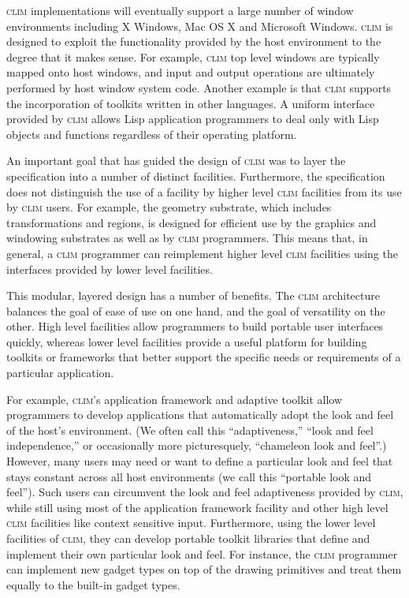 \documentclass[twocolumn,a4paper]{article}
\newcommand {\CLIM}{\textsc{clim}}
\begin{document}
\CLIM{} implementations will eventually support a large number of window environments
including X Windows, Mac OS X and Microsoft Windows. \CLIM{} is
designed to exploit the functionality provided by the host environment
to the degree that it makes sense. For example, \CLIM{} top level
windows are typically mapped onto host windows, and input and output
operations are ultimately performed by host window system
code. Another example is that \CLIM{} supports the incorporation of
toolkits written in other languages. A uniform interface provided by
\CLIM{} allows Lisp application programmers to deal only with Lisp
objects and functions regardless of their operating platform.

An important goal that has guided the design of \CLIM{} was to
layer the specification into a number of distinct
facilities. Furthermore, the specification does not distinguish the
use of a facility by higher level \CLIM{} facilities from its use by
\CLIM{} users. For example, the geometry substrate, which includes
transformations and regions, is designed for efficient use by the
graphics and windowing substrates as well as by \CLIM{} programmers. This
means that, in general, a \CLIM{} programmer can reimplement higher level
\CLIM{} facilities using the interfaces provided by lower level
facilities.

This modular, layered design has a number of benefits. The \CLIM{}
architecture balances the goal of ease of use on one hand, and the
goal of versatility on the other. High level facilities allow
programmers to build portable user interfaces quickly, whereas lower
level facilities provide a useful platform for building toolkits or
frameworks that better support the specific needs or requirements of a
particular application.

For example, \CLIM{}'s application framework and adaptive toolkit
allow programmers to develop applications that automatically adopt the look
and feel of the host's environment. (We often call this
``adaptiveness,'' ``look and feel independence,'' or occasionally more
picturesquely, ``chameleon look and feel''.) However, many users may
need or want to define a particular look and feel that stays constant
across all host environments (we call this ``portable look and
feel''). Such users can circumvent the look and feel adaptiveness
provided by \CLIM{}, while still using most of the application
framework facility and other high level \CLIM{} facilities like
context sensitive input. Furthermore, using the lower level facilities
of \CLIM{}, they can develop portable toolkit libraries that define
and implement their own particular look and feel. For instance, the
\CLIM{} programmer can implement new gadget types on top of the drawing
primitives and treat them equally to the built-in gadget types.
\end{document}
